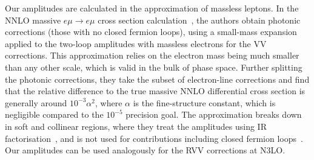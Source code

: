 \documentclass[main.tex]{subfiles}
\begin{document}
Our amplitudes are calculated in the approximation of massless leptons.
In the \ac{NNLO} massive $e\mu \to e\mu$ cross section calculation~\cite{Broggio:2022htr}, the authors obtain photonic corrections (those with no closed fermion loops), using a small-mass expansion~\cite{Penin:2005eh,Becher:2007cu,Engel:2018fsb} applied to the two-loop amplitudes with massless electrons for the \ac{VV} corrections.
This approximation relies on the electron mass being much smaller than any other scale, which is valid in the bulk of phase space.
Further splitting the photonic corrections, they take the subset of electron-line corrections and find that the relative difference to the true massive \ac{NNLO} differential cross section is generally around $10^{-3}\alpha^2$, where $\alpha$ is the fine-structure constant, which is negligible compared to the $10^{-5}$ precision goal.
The approximation breaks down in soft and collinear regions, where they treat the amplitudes using \ac{IR} factorisation~\cite{Banerjee:2021mty,Engel:2021ccn,Engel:2023ifn}, and is not used for contributions including closed fermion loops~\cite{Engel:2018fsb,Engel:2019nfw}.
Our amplitudes can be used analogously for the \ac{RVV} corrections at \ac{N3LO}.
\end{document}
